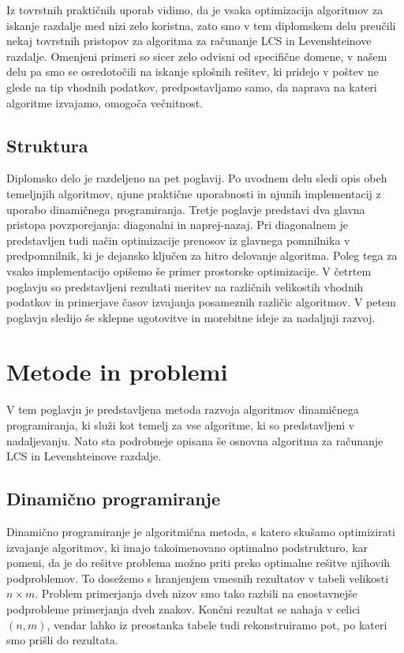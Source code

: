 \documentclass[a4paper,12pt,openright]{book}
\begin{document}
Iz tovrstnih praktičnih uporab vidimo, da je vsaka optimizacija algoritmov za iskanje razdalje med nizi zelo koristna, zato smo v tem diplomskem delu preučili nekaj tovrstnih pristopov za algoritma za računanje LCS in Levenshteinove razdalje. Omenjeni primeri so sicer zelo odvisni od specifične domene, v našem delu pa smo se osredotočili na iskanje splošnih rešitev, ki pridejo v poštev ne glede na tip vhodnih podatkov, predpostavljamo samo, da naprava na kateri algoritme izvajamo, omogoča večnitnost. 

\section{Struktura}

Diplomsko delo je razdeljeno na pet poglavij. Po uvodnem delu sledi opis obeh temeljnjih algoritmov, njune praktične uporabnosti in njunih implementacij z uporabo dinamičnega programiranja. Tretje poglavje predstavi dva glavna pristopa povzporejanja: diagonalni in naprej-nazaj. Pri diagonalnem je predstavljen tudi način optimizacije prenosov iz glavnega pomnilnika v predpomnilnik, ki je dejansko ključen za hitro delovanje algoritma. Poleg tega za vsako implementacijo opišemo še primer prostorske optimizacije. V četrtem poglavju so predstavljeni rezultati meritev na različnih velikostih vhodnih podatkov in primerjave časov izvajanja posameznih različic algoritmov. V petem poglavju sledijo še sklepne ugotovitve in morebitne ideje za nadaljnji razvoj. 

\chapter{Metode in problemi}

V tem poglavju je predstavljena metoda razvoja algoritmov dinamičnega programiranja, ki služi kot temelj za vse algoritme, ki so predstavljeni v nadaljevanju. Nato sta podrobneje opisana še osnovna algoritma za računanje LCS in Levenshteinove razdalje. 

\section{Dinamično programiranje}

Dinamično programiranje je algoritmična metoda, s katero skušamo optimizirati izvajanje algoritmov, ki imajo takoimenovano optimalno podstrukturo, kar pomeni, da je do rešitve problema možno priti preko optimalne rešitve njihovih podproblemov. To dosežemo s hranjenjem vmesnih rezultatov v tabeli velikosti $n \times m$. Problem primerjanja dveh nizov smo tako razbili na enostavnejše podprobleme primerjanja dveh znakov. Končni rezultat se nahaja v celici $(n,m)$, vendar lahko iz preostanka tabele tudi rekonstruiramo pot, po kateri smo prišli do rezultata. 
\end{document}

